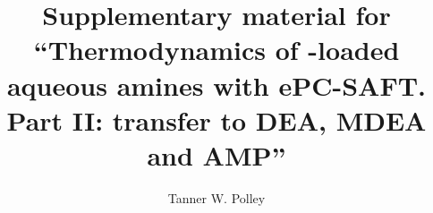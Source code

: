 \documentclass[a4paper,11pt]{article}
\title{Supplementary material for ``Thermodynamics of \ce{CO2}-loaded aqueous amines with ePC-SAFT. Part II: transfer to DEA, MDEA and AMP''}
\author{Tanner W. Polley}
\date{}
\begin{document}
\maketitle

\FloatBarrier


\end{document}
